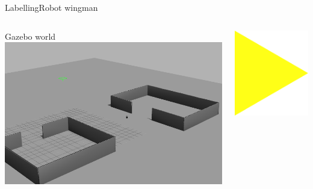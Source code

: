 \begin{frame}{Labelling}{Robot wingman}

\begin{columns}

\begin{minipage}{\textwidth}
\begin{block}{Gazebo world}
\centering
\includegraphics[width = \textwidth]{./figure/simulation/gazebo.png}
\end{block}
\end{minipage}

\begin{minipage}{\textwidth}
\centering
\includegraphics[width = \textwidth]{./figure/arrow2}
\end{minipage}


\end{columns}
\end{frame}
